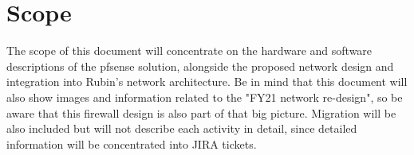 \section{Scope}
The scope of this document will concentrate on the hardware and software descriptions of the pfsense solution, alongside the proposed network design and integration into Rubin's network architecture. Be in mind that this document will also show images and information related to the "FY21 network re-design", so be aware that this firewall design is also part of that big picture. Migration will be also included but will not describe each activity in detail, since detailed information will be concentrated into JIRA tickets. 